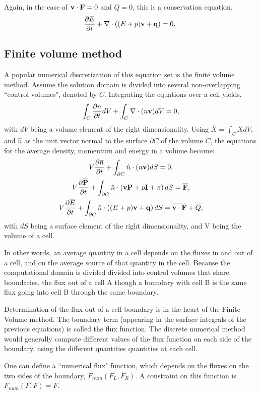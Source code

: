 Again, in the case of $\mathbf{v}\cdot\mathbf{F} = 0$ and $Q=0$, this is a conservation equation. 
\begin{gather}
    \frac{\partial E}{\partial t} + \nabla \cdot\left((E + p)\mathbf{v} +\mathbf{q}\right) =  0.~\label{eq:energy_conservation}
\end{gather}

\subsection*{Finite volume method}

A popular numerical discretization of this equation set is the finite volume method. Assume the solution domain is divided into several non-overlapping ``control volumes", denoted by $C$. Integrating the equations over a cell yields,
\begin{gather}
	\int_C\frac{\partial n}{\partial t}dV + \int_C \nabla \cdot (n \mathbf{v})dV = 0,
\end{gather}
with $dV$ being a volume element of the right dimensionality. Using $\overline X = \int_C X dV$, and $\hat n$ as the unit vector normal to the surface $\partial C$ of the volume $C$, the equations for the average density, momentum and energy in a volume become:
\begin{gather}
	V\frac{\partial \overline n}{\partial t} + \int_{\partial C} \hat n \cdot (n \mathbf{v})dS = 0,\\
    	V\frac{\partial \overline {\mathbf{P}}}{\partial t} + \int_{\partial C} \hat n  \cdot\left(\mathbf{v} \mathbf{P} + p \mathbf{I} + \pi\right)dS = \overline {\mathbf{F}},\\
    	V\frac{\partial \overline E}{\partial t} +  \int_{\partial C} \hat n \cdot \left( (E + p)\mathbf{v}+\mathbf{q}\right)dS =  \overline{\mathbf{v}\cdot\mathbf{F}}+ \overline Q,
\end{gather}
with $dS$ being a surface element of the right dimensionality, and V being the volume of a cell.

In other words, an average quantity in a cell depends on the fluxes in and out of a cell, and on the average source of that quantity in the cell. Because the computational domain is divided divided into control volumes that share boundaries, the flux out of a cell A though a boundary with cell B is the same flux going into cell B through the same boundary.

Determination of the flux out of a cell boundary is in the heart of the Finite Volume method. The boundary term (appearing in the surface integrals of the previous equations) is called the flux function. The discrete numerical method would generally compute different values of the flux function on each side of the boundary, using the different quantities quantities at each cell.

One can define a ``numerical flux" function, which depends on the fluxes on the two sides of the boundary, $F_{num}(F_L, F_R)$. A constraint on this function is $F_{num}(F, F) = F$. 
























